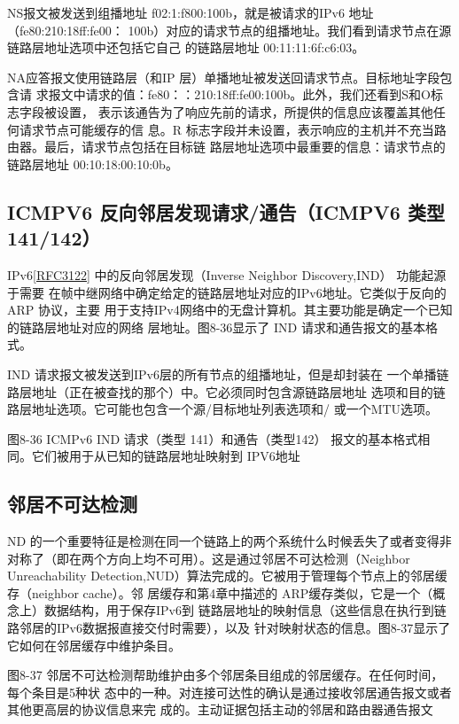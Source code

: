 NS报文被发送到组播地址 f02:1:f800:100b，就是被请求的IPv6 地址 （fe80:210:18ff:fe00：
100b）对应的请求节点的组播地址。我们看到请求节点在源链路层地址选项中还包括它自己
的链路层地址 00:11:11:6f:c6:03。

NA应答报文使用链路层（和IP 层）单播地址被发送回请求节点。目标地址字段包含请
求报文中请求的值：fe80：：210:18ff:fe00:100b。此外，我们还看到S和O标志字段被设置，
表示该通告为了响应先前的请求，所提供的信息应该覆盖其他任何请求节点可能缓存的信
息。R 标志字段并未设置，表示响应的主机并不充当路由器。最后，请求节点包括在目标链
路层地址选项中最重要的信息：请求节点的链路层地址 00:10:18:00:10:0b。

\subsection{ICMPV6 反向邻居发现请求/通告（ICMPV6 类型141/142）}

IPv6\href{https://www.rfc-editor.org/rfc/rfc3122}{[RFC3122]} 中的反向邻居发现（Inverse Neighbor Discovery,IND） 功能起源于需要
在帧中继网络中确定给定的链路层地址对应的IPv6地址。它类似于反向的ARP 协议，主要
用于支持IPv4网络中的无盘计算机。其主要功能是确定一个已知的链路层地址对应的网络
层地址。图8-36显示了 IND 请求和通告报文的基本格式。

IND 请求报文被发送到IPv6层的所有节点的组播地址，但是却封装在
一个单播链路层地址（正在被查找的那个）中。它必须同时包含源链路层地址
选项和目的链路层地址选项。它可能也包含一个源/目标地址列表选项和/
或一个MTU选项。

图8-36 ICMPv6 IND 请求（类型 141）和通告（类型142）
报文的基本格式相同。它们被用于从已知的链路层地址映射到 IPV6地址

\subsection{邻居不可达检测}

ND 的一个重要特征是检测在同一个链路上的两个系统什么时候丢失了或者变得非
对称了（即在两个方向上均不可用）。这是通过邻居不可达检测（Neighbor Unreachability
Detection,NUD）算法完成的。它被用于管理每个节点上的邻居缓存（neighbor cache）。邻
居缓存和第4章中描述的 ARP缓存类似，它是一个（概念上）数据结构，用于保存IPv6到
链路层地址的映射信息（这些信息在执行到链路邻居的IPv6数据报直接交付时需要），以及
针对映射状态的信息。图8-37显示了它如何在邻居缓存中维护条目。

图8-37 邻居不可达检测帮助维护由多个邻居条目组成的邻居缓存。在任何时间，每个条目是5种状
态中的一种。对连接可达性的确认是通过接收邻居通告报文或者其他更高层的协议信息来完
成的。主动证据包括主动的邻居和路由器通告报文

